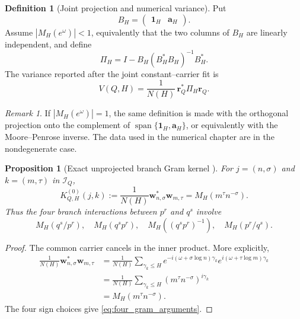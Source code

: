 \documentclass[11pt]{amsart}
\numberwithin{equation}{section}
\theoremstyle{plain}
\newtheorem{proposition}[theorem]{Proposition}
\theoremstyle{definition}
\newtheorem{definition}[theorem]{Definition}
\theoremstyle{remark}
\newtheorem{remark}[theorem]{Remark}
\newcommand{\1}{\mathbf{1}}
\begin{document}
\begin{definition}[Joint projection and numerical variance]
\label{def:joint_projection_variance}
Put
\begin{equation}
B_H=
\begin{pmatrix}
\mathbf 1_H&\mathbf a_H
\end{pmatrix}.
\label{eq:BH_definition}
\end{equation}
Assume $|M_H(e^\omega)|<1$, equivalently that the two columns of $B_H$
are linearly independent, and define
\begin{equation}
\Pi_H
=
I-B_H(B_H^\ast B_H)^{-1}B_H^\ast.
\label{eq:PiH_exact_definition}
\end{equation}
The variance reported after the joint constant--carrier fit is
\begin{equation}
\boxed{
V(Q,H)
=
\frac1{N(H)}\,\mathbf r_Q^\ast\Pi_H\mathbf r_Q.
}
\label{eq:numerical_variance_exact_definition}
\end{equation}
\end{definition}

\begin{remark}
\label{rem:degenerate_joint_projection}
If $|M_H(e^\omega)|=1$, the same definition is made with the orthogonal
projection onto the complement of
$\operatorname{span}\{\mathbf 1_H,\mathbf a_H\}$, or equivalently with
the Moore--Penrose inverse.  The data used in the numerical chapter are in
the nondegenerate case.
\end{remark}


\begin{proposition}[Exact unprojected branch Gram kernel {}]
\label{prop:unprojected_gram}
For $j=(n,\sigma)$ and $k=(m,\tau)$ in $\mathcal I_Q$,
\begin{equation}
K^{(0)}_{Q,H}(j,k)
:=
\frac1{N(H)}\mathbf w_{n,\sigma}^\ast\mathbf w_{m,\tau}
=
M_H(m^\tau n^{-\sigma}).
\label{eq:unprojected_gram}
\end{equation}
Thus the four branch interactions between $p^r$ and $q^s$ involve
\begin{equation}
M_H(q^s/p^r),
\quad
M_H(q^sp^r),
\quad
M_H((q^sp^r)^{-1}),
\quad
M_H(p^r/q^s).
\label{eq:four_gram_arguments}
\end{equation}
\end{proposition}

\begin{proof}
The common carrier cancels in the inner product.  More explicitly,
\begin{align}
\frac1{N(H)}\mathbf w_{n,\sigma}^\ast\mathbf w_{m,\tau}
&=
\frac1{N(H)}
\sum_{\gamma_k\leq H}
 e^{-i(\omega+\sigma\log n)\gamma_k}
 e^{ i(\omega+\tau\log m)\gamma_k}
\label{eq:branch_gram_expansion}
\\
&=
\frac1{N(H)}
\sum_{\gamma_k\leq H}
(m^\tau n^{-\sigma})^{i\gamma_k}
\label{eq:branch_gram_kernel_step}
\\
&=
M_H(m^\tau n^{-\sigma}).
\label{eq:branch_gram_kernel_result}
\end{align}
The four sign choices give \eqref{eq:four_gram_arguments}.
\end{proof}
\end{document}
